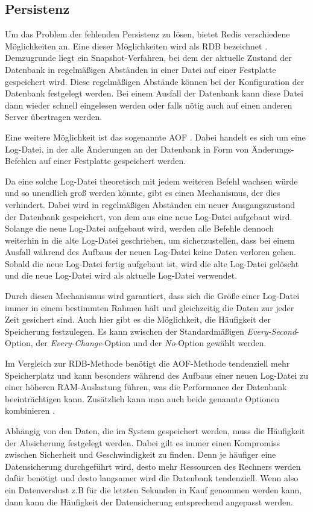 
\subsection{Persistenz}
\label{sec:Persistenz}
Um das Problem der fehlenden Persistenz zu lösen, bietet Redis verschiedene Möglichkeiten an.
Eine dieser Möglichkeiten wird als \ac{RDB} bezeichnet \cite{Redis-Docs-Persistenz}. 
Demzugrunde liegt ein Snapshot-Verfahren, bei dem der aktuelle Zustand der Datenbank in regelmäßigen Abständen in einer Datei auf einer Festplatte gespeichert wird.
Diese regelmäßigen Abstände können bei der Konfiguration der Datenbank festgelegt werden. 
Bei einem Ausfall der Datenbank kann diese Datei dann wieder schnell eingelesen werden oder falls nötig auch auf einen anderen Server übertragen werden.

Eine weitere Möglichkeit ist das sogenannte \ac{AOF} \cite{Redis-Docs-Persistenz}. 
Dabei handelt es sich um eine Log-Datei, in der alle Änderungen an der Datenbank in Form von Änderungs-Befehlen auf einer Festplatte gespeichert werden.

Da eine solche Log-Datei theoretisch mit jedem weiteren Befehl wachsen würde und so unendlich groß werden könnte, gibt es einen Mechanismus, der dies verhindert.
Dabei wird in regelmäßigen Abständen ein neuer Ausgangszustand der Datenbank gespeichert, von dem aus eine neue Log-Datei aufgebaut wird. 
Solange die neue Log-Datei aufgebaut wird, werden alle Befehle dennoch weiterhin in die alte Log-Datei geschrieben, um sicherzustellen, dass bei einem Ausfall während des Aufbaus der neuen Log-Datei keine Daten verloren gehen.
Sobald die neue Log-Datei fertig aufgebaut ist, wird die alte Log-Datei gelöscht und die neue Log-Datei wird als aktuelle Log-Datei verwendet.

Durch diesen Mechanismus wird garantiert, dass sich die Größe einer Log-Datei immer in einem bestimmten Rahmen hält und gleichzeitig die Daten zur jeder Zeit gesichert sind.
Auch hier gibt es die Möglichkeit, die Häufigkeit der Speicherung festzulegen. Es kann zwischen der Standardmäßigen \textit{Every-Second}-Option, der \textit{Every-Change}-Option und der \textit{No}-Option gewählt werden.

Im Vergleich zur \acs{RDB}-Methode benötigt die \acs{AOF}-Methode tendenziell mehr Speicherplatz und kann besonders während des Aufbaus einer neuen Log-Datei zu einer höheren \acs{RAM}-Auslastung führen, was die Performance der Datenbank beeinträchtigen kann.
Zusätzlich kann man auch beide genannte Optionen kombinieren \cite{Redis-Docs-Persistenz}.

Abhängig von den Daten, die im System gespeichert werden, muss die Häufigkeit der Absicherung festgelegt werden.
Dabei gilt es immer einen Kompromiss zwischen Sicherheit und Geschwindigkeit zu finden.
Denn je häufiger eine Datensicherung durchgeführt wird, desto mehr Ressourcen des Rechners werden dafür benötigt und desto langsamer wird die Datenbank tendenziell.
Wenn also ein Datenverslust z.B für die letzten Sekunden in Kauf genommen werden kann, dann kann die Häufigkeit der Datensicherung entsprechend angepasst werden.

